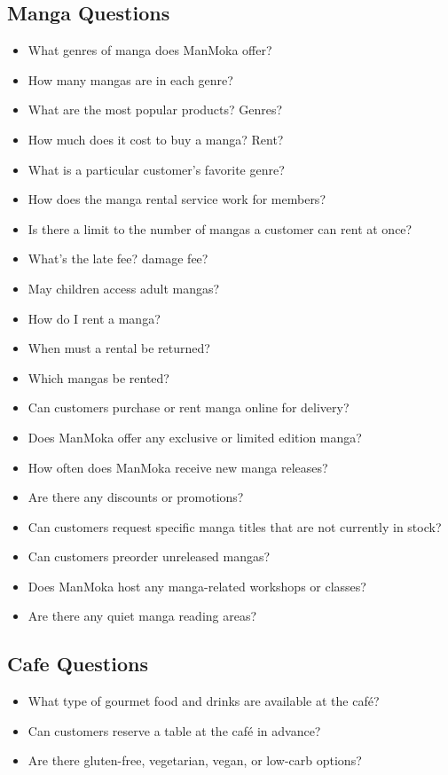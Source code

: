 \documentclass{scrartcl}
\begin{document}
\subsection*{Manga Questions}
\begin{itemize}
\item What genres of manga does ManMoka offer?
\item How many mangas are in each genre?
\item What are the most popular products? Genres?
\item How much does it cost to buy a manga? Rent?
\item What is a particular customer's favorite genre?
\item How does the manga rental service work for members?
\item Is there a limit to the number of mangas a customer can rent at once?
\item What's the late fee? damage fee?
\item May children access adult mangas?
\item How do I rent a manga?
\item When must a rental be returned?
\item Which mangas be rented?
\item Can customers purchase or rent manga online for delivery?
\item Does ManMoka offer any exclusive or limited edition manga?
\item How often does ManMoka receive new manga releases?
\item Are there any discounts or promotions?
\item Can customers request specific manga titles that are not currently in stock?
\item Can customers preorder unreleased mangas?
\item Does ManMoka host any manga-related workshops or classes?
\item Are there any quiet manga reading areas?
\end{itemize}

\subsection*{Cafe Questions}

\begin{itemize}
\item What type of gourmet food and drinks are available at the café?
\item Can customers reserve a table at the café in advance?
\item Are there gluten-free, vegetarian, vegan, or low-carb options?
\end{itemize}
\end{document}
